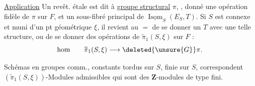 \uline{Application} Un revêt. étale  est dit à \uline{groupe structural} $\pi$, ,   donné une opération fidèle de $\pi$ sur $F$, et un sous-fibré  principal de $\underline{\operatorname{Isom}}_S(E_S,T)$. Si $S$ est connexe et muni d'un pt géométrique $\xi$, il revient au $=$ de se donner un $T$ avec une telle structure, ou de se donner des opérations  de $\widetilde\pi_1(S,\xi)$  sur $F$ :
\[
\text{hom}\qquad\widetilde\pi_1(S,\xi)\longrightarrow\deleted{\unsure{G}}\pi.
\]

\uline{} Schémas en groupes comm., constants tordus sur $S$,   finie sur $S$, correspondent  $(\widetilde\pi_1(S,\xi))$-Modules admissibles  qui sont des $\mathbf Z$-modules de type fini.
